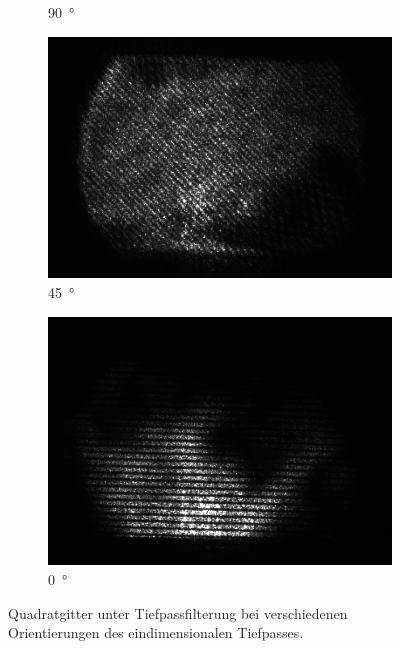 \documentclass[
	a4paper,
	12pt,
	pagesize,
	ngerman
]{scrartcl}
\begin{document}
\begin{figure}[H]
\begin{subfigure}[b]{0.475\textwidth}
            \caption[]%
            {\SI{90}{\degree}}
            \label{fig_4_quad_90}
        \end{subfigure}
        \hfill
				\begin{subfigure}[b]{0.475\textwidth}
            \centering
            \includegraphics[width=\textwidth]{raw/4/4_quad_spaltdiagonal_crop}
            \caption%
            {\SI{45}{\degree}}
            \label{fig_4_quad_45}
        \end{subfigure}
        \begin{subfigure}[b]{0.475\textwidth}
            \centering
            \includegraphics[width=\textwidth]{raw/4/4_quad_spaltsenkrecht_crop}
            \caption%
            {\SI{0}{\degree}}
            \label{fig_4_quad_0}
        \end{subfigure}
        \caption%
        {
					Quadratgitter unter Tiefpassfilterung bei verschiedenen Orientierungen des eindimensionalen Tiefpasses.
				}
        \label{fig_4_quad}
    \end{figure}
\end{document}
